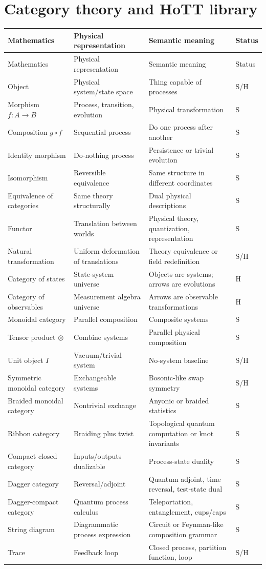 \documentclass[11pt]{article}
\newcommand{\status}[1]{\textsf{#1}}
\newcommand{\entry}[4]{#1 & #2 & #3 & \status{#4}\\}
\begin{document}
\section{Category theory and HoTT library}
\begin{longtable}{@{}>{\raggedright\arraybackslash}p{}>{\raggedright\arraybackslash}p{}>{\raggedright\arraybackslash}p{}>{\centering\arraybackslash}p{}@{}}
\toprule
Mathematics & Physical representation & Semantic meaning & Status\\
\midrule
\endfirsthead
\toprule
Mathematics & Physical representation & Semantic meaning & Status\\
\midrule
\endhead
\bottomrule
\endfoot
\entry{Object}{Physical system/state space}{Thing capable of processes}{S/H}
\entry{Morphism $f:A\to B$}{Process, transition, evolution}{Physical transformation}{S}
\entry{Composition $g\circ f$}{Sequential process}{Do one process after another}{S}
\entry{Identity morphism}{Do-nothing process}{Persistence or trivial evolution}{S}
\entry{Isomorphism}{Reversible equivalence}{Same structure in different coordinates}{S}
\entry{Equivalence of categories}{Same theory structurally}{Dual physical descriptions}{S}
\entry{Functor}{Translation between worlds}{Physical theory, quantization, representation}{S}
\entry{Natural transformation}{Uniform deformation of translations}{Theory equivalence or field redefinition}{S/H}
\entry{Category of states}{State-system universe}{Objects are systems; arrows are evolutions}{H}
\entry{Category of observables}{Measurement algebra universe}{Arrows are observable transformations}{H}
\entry{Monoidal category}{Parallel composition}{Composite systems}{S}
\entry{Tensor product $\otimes$}{Combine systems}{Parallel physical composition}{S}
\entry{Unit object $I$}{Vacuum/trivial system}{No-system baseline}{S/H}
\entry{Symmetric monoidal category}{Exchangeable systems}{Bosonic-like swap symmetry}{S/H}
\entry{Braided monoidal category}{Nontrivial exchange}{Anyonic or braided statistics}{S}
\entry{Ribbon category}{Braiding plus twist}{Topological quantum computation or knot invariants}{S}
\entry{Compact closed category}{Inputs/outputs dualizable}{Process-state duality}{S}
\entry{Dagger category}{Reversal/adjoint}{Quantum adjoint, time reversal, test-state dual}{S}
\entry{Dagger-compact category}{Quantum process calculus}{Teleportation, entanglement, cups/caps}{S}
\entry{String diagram}{Diagrammatic process expression}{Circuit or Feynman-like composition grammar}{S}
\entry{Trace}{Feedback loop}{Closed process, partition function, loop}{S/H}

\end{longtable}
\end{document}
